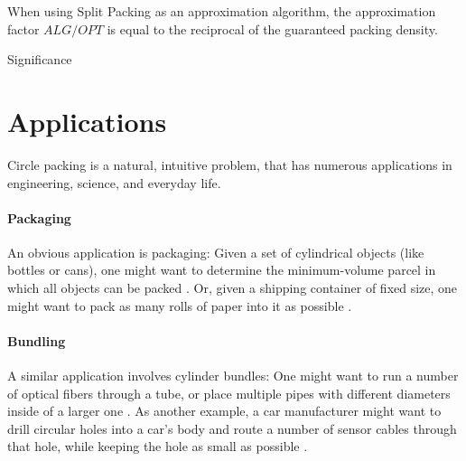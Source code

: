\documentclass[a4paper,style=print,oneside,bibliography=totoc,nexus,lnum,extramargin]{tubsbook}
\begin{document}
When using Split Packing as an approximation algorithm, the approximation factor $ALG/OPT$ is equal to the reciprocal of the guaranteed packing density.

Significance

%
%
%

\section{Applications}

Circle packing is a natural, intuitive problem, that has numerous applications in engineering, science, and everyday life.

\paragraph{Packaging}

An obvious application is packaging: Given a set of cylindrical objects (like bottles or cans), one might want to determine the minimum-volume parcel in which all objects can be packed \parencite{CKP2008solving}. Or, given a shipping container of fixed size, one might want to pack as many rolls of paper into it as possible \parencite{fraser1994integrated}.

\paragraph{Bundling}

A similar application involves cylinder bundles:
One might want to run a number of optical fibers through a tube, or place multiple pipes with different diameters inside of a larger one \parencite{WHZX2002improved}. As another example, a car manufacturer might want to drill circular holes into a car's body and route a number of sensor cables through that hole, while keeping the hole as small as possible \cite{SSSKK2004disk}.
\end{document}
